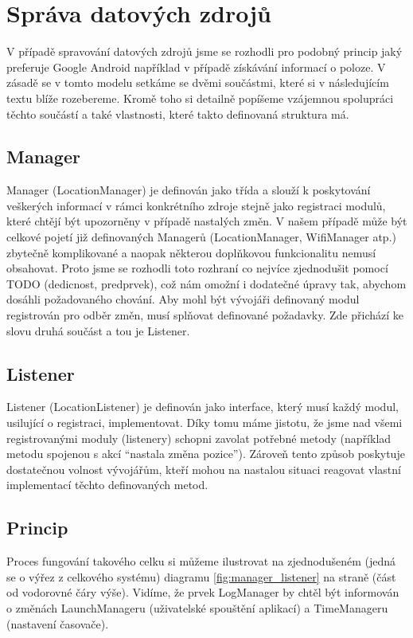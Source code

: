 \documentclass[thesis=M,czech]{FITthesis}[2012/06/26]
\begin{document}
\section{Správa datových zdrojů}
V případě spravování datových zdrojů jsme se rozhodli pro podobný princip jaký preferuje Google Android například v případě získávání informací o poloze\cite{android_location}. V zásadě se v tomto modelu setkáme se dvěmi součástmi, které si v následujícím textu blíže rozebereme. Kromě toho si detailně popíšeme vzájemnou spolupráci těchto součástí a také vlastnosti, které takto definovaná struktura má.

\subsection{Manager}
Manager (LocationManager\cite{android_location_manager}) je definován jako třída\cite{class} a slouží k poskytování veškerých informací v rámci konkrétního zdroje stejně jako registraci modulů, které chtějí být upozorněny v případě nastalých změn. V našem případě může být celkové pojetí již definovaných Managerů (LocationManager, WifiManager atp.) zbytečně komplikované a naopak některou doplňkovou funkcionalitu nemusí obsahovat. Proto jsme se rozhodli toto rozhraní co nejvíce zjednodušit pomocí TODO (dedicnost, predprvek), což nám omožní i dodatečné úpravy tak, abychom dosáhli požadovaného chování. Aby mohl být vývojáři definovaný modul registrován pro odběr změn, musí splňovat definované požadavky. Zde přichází ke slovu druhá součást a tou je Listener.

\subsection{Listener}
Listener (LocationListener\cite{android_location_listener}) je definován jako interface\cite{interface}, který musí každý modul, usilující o registraci, implementovat. Díky tomu máme jistotu, že jsme nad všemi registrovanými moduly (listenery) schopni zavolat potřebné metody (například metodu spojenou s akcí “nastala změna pozice”). Zároveň tento způsob poskytuje dostatečnou volnost vývojářům, kteří mohou na nastalou situaci reagovat vlastní implementací těchto definovaných metod.

\subsection{Princip}
Proces fungování takového celku si můžeme ilustrovat na zjednodušeném (jedná se o výřez z celkového systému) diagramu \ref{fig:manager_listener} na straně \pageref{fig:manager_listener} (část od vodorovné čáry výše). Vidíme, že prvek LogManager by chtěl být informován o změnách LaunchManageru (uživatelské spouštění aplikací) a TimeManageru (nastavení časovače).
\end{document}
